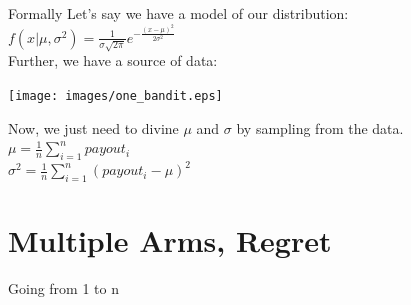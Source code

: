 \documentclass{powerdot}
\begin{document}
\begin{slide}{Formally}
  Let's say we have a model of our distribution:\\
  $ f(x | \mu, \sigma^2)= \frac{1}{\sigma \sqrt{2\pi}} e^{-
    \frac{(x-\mu)^2}{2\sigma^2}}$\\\pause
  \vspace{0.2in}
  Further, we have a source of data:\\ %
  \begin{center}\texttt{[image: images/one\_bandit.eps]}\end{center}\pause
  Now, we just need to divine $\mu$ and $\sigma$ by sampling from the data.\\ %

  $\mu = \frac{1}{n} \sum_{i=1}^{n} payout_i$\\
  $\sigma^2 = \frac{1}{n} \sum_{i=1}^{n} (payout_i - \mu)^2$
\end{slide}

\section{Multiple Arms, Regret}
\begin{slide}{Going from 1 to n}
\end{slide}
\end{document}
